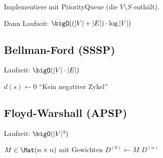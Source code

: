 Implementiere mit PriorityQueue (die $V \setminus S$ enthält).

Dann Laufzeit: $\bigO((|V|+|E|)\cdot\log|V|)$

\subsection*{Bellman-Ford (SSSP)}
Laufzeit: $\bigO(|V|\cdot|E|)$

\begin{algorithm}[H]
	$d(s) \gets 0$\;
	\KwRet \enquote{Kein negativer Zykel}\;
\end{algorithm}

\subsection*{Floyd-Warshall (APSP)}
Laufzeit: $\bigO(|V|^3)$

\begin{algorithm}[H]
	$M \in \Mat(n\times n)$ mit Gewichten\;
	$D^{(0)} \gets M$\;
	\KwRet $D^{(n)}$\;
\end{algorithm}
